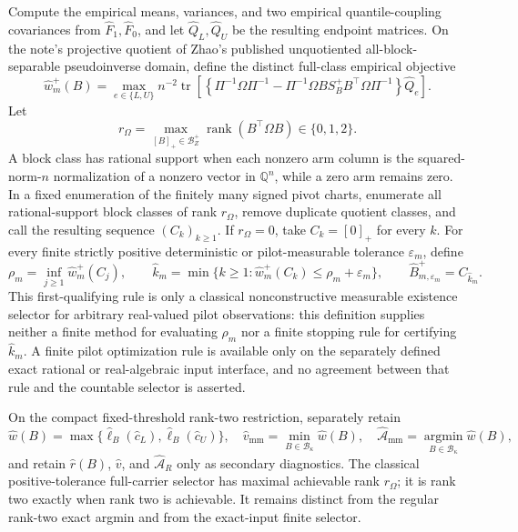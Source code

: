 Compute the empirical means, variances, and two empirical quantile-coupling covariances from \(\widehat F_1,\widehat F_0\), and let \(\widehat Q_L,\widehat Q_U\) be the resulting endpoint matrices.  On the note's projective quotient of Zhao's published unquotiented all-block-separable pseudoinverse domain, define the distinct full-class empirical objective
\[
\widehat w_m^+(B)=
\max_{e\in\{L,U\}}n^{-2}\operatorname{tr}\!\left[
\left\{\Pi^{-1}\Omega\Pi^{-1}
-\Pi^{-1}\Omega B S_B^+B^{\top}\Omega\Pi^{-1}\right\}\widehat Q_e
\right].
\]
Let
\[
r_\Omega=\max_{[B]_+\in\mathcal B_Z^+}\operatorname{rank}(B^{\top}\Omega B)\in\{0,1,2\}.
\]
A block class has rational support when each nonzero arm column is the squared-norm-\(n\) normalization of a nonzero vector in \(\mathbb Q^n\), while a zero arm remains zero.  In a fixed enumeration of the finitely many signed pivot charts, enumerate all rational-support block classes of rank \(r_\Omega\), remove duplicate quotient classes, and call the resulting sequence \((C_k)_{k\ge1}\).  If \(r_\Omega=0\), take \(C_k=[0]_+\) for every \(k\).  For every finite strictly positive deterministic or pilot-measurable tolerance \(\varepsilon_m\), define
\[
 \rho_m=\inf_{j\ge1}\widehat w_m^+(C_j),
 \qquad
 \widehat k_m=
 \min\{k\ge1:\widehat w_m^+(C_k)\le\rho_m+\varepsilon_m\},
 \qquad
 \widehat B_{m,\varepsilon_m}^+=C_{\widehat k_m}.
\]
This first-qualifying rule is only a classical nonconstructive measurable existence selector for arbitrary real-valued pilot observations: this definition supplies neither a finite method for evaluating \(\rho_m\) nor a finite stopping rule for certifying \(\widehat k_m\).  A finite pilot optimization rule is available only on the separately defined exact rational or real-algebraic input interface, and no agreement between that rule and the countable selector is asserted.

On the compact fixed-threshold rank-two restriction, separately retain
\[
\widehat w(B)=\max\{\widehat\ell_B(\widehat c_L),\widehat\ell_B(\widehat c_U)\},
\quad
\widehat v_{\mathrm{mm}}=\min_{B\in\mathcal B_\kappa}\widehat w(B),
\quad
\widehat{\mathcal A}_{\mathrm{mm}}=\operatorname*{argmin}_{B\in\mathcal B_\kappa}\widehat w(B),
\]
and retain \(\widehat r(B)\), \(\widehat v\), and \(\widehat{\mathcal A}_R\) only as secondary diagnostics.  The classical positive-tolerance full-carrier selector has maximal achievable rank \(r_\Omega\); it is rank two exactly when rank two is achievable.  It remains distinct from the regular rank-two exact argmin and from the exact-input finite selector.